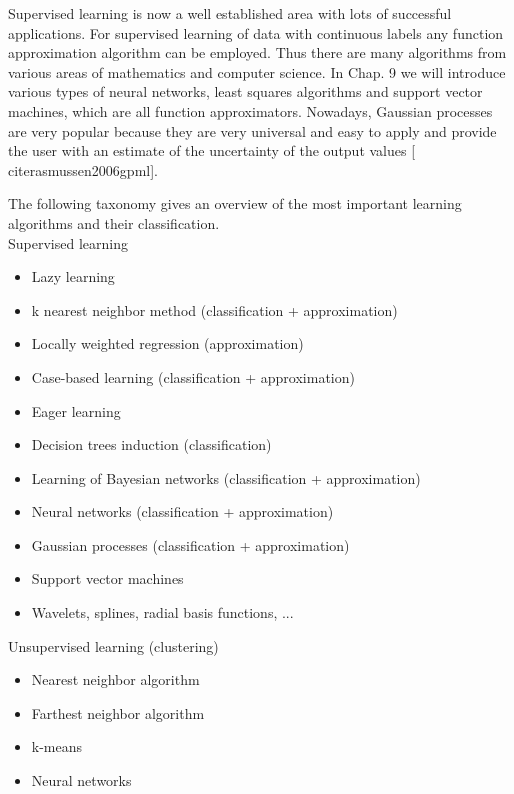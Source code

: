 \documentclass[10pt]{book}
\begin{document}
Supervised learning is now a well established area with lots of successful applications. For supervised learning of data with continuous labels any function approximation algorithm can be employed. Thus there are many algorithms from various areas of mathematics and computer science. In Chap. 9 we will introduce various types of neural networks, least squares algorithms and support vector machines, which are all function approximators. Nowadays, Gaussian processes are very popular because they are very universal and easy to apply and provide the user with an estimate of the uncertainty of the output values [\\cite{rasmussen2006gpml}].

The following taxonomy gives an overview of the most important learning algorithms and their classification.\\

Supervised learning

\begin{itemize}
  \item Lazy learning
  \item k nearest neighbor method (classification + approximation)
  \item Locally weighted regression (approximation)
  \item Case-based learning (classification + approximation)
  \item Eager learning
  \item Decision trees induction (classification)
  \item Learning of Bayesian networks (classification + approximation)
  \item Neural networks (classification + approximation)
  \item Gaussian processes (classification + approximation)
  \item Support vector machines
  \item Wavelets, splines, radial basis functions, ...
\end{itemize}

Unsupervised learning (clustering)

\begin{itemize}
  \item Nearest neighbor algorithm
  \item Farthest neighbor algorithm
  \item k-means
  \item Neural networks
\end{itemize}
\end{document}

